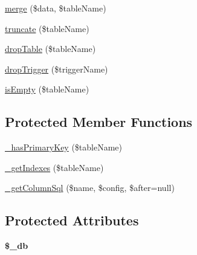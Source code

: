 \begin{DoxyCompactItemize}
\item 
\hyperlink{classDbSync__Table__DbAdapter__Mysql_a15ec3683b5473be0e2c7a24b9e78dfb5}{merge} (\$data, \$tableName)
\item 
\hyperlink{classDbSync__Table__DbAdapter__Mysql_a3bd21ebc1da5c9eb8b17c884201226d8}{truncate} (\$tableName)
\item 
\hyperlink{classDbSync__Table__DbAdapter__Mysql_ae489c716f124c842b3effd83433b0bda}{dropTable} (\$tableName)
\item 
\hyperlink{classDbSync__Table__DbAdapter__Mysql_a47230a67ff7e8c926ee6fb421764e5ec}{dropTrigger} (\$triggerName)
\item 
\hyperlink{classDbSync__Table__DbAdapter__Mysql_a492a22c32d988393ab5456eec80b6923}{isEmpty} (\$tableName)
\end{DoxyCompactItemize}
\subsection*{Protected Member Functions}
\begin{DoxyCompactItemize}
\item 
\hyperlink{classDbSync__Table__DbAdapter__Mysql_a56894feff172b0d77cad42b4aebf0ade}{\_\-hasPrimaryKey} (\$tableName)
\item 
\hyperlink{classDbSync__Table__DbAdapter__Mysql_acc41d16b369c99409607267268e0764e}{\_\-getIndexes} (\$tableName)
\item 
\hyperlink{classDbSync__Table__DbAdapter__Mysql_a1a7d3bca83371bcb16cd7a59f810bb58}{\_\-getColumnSql} (\$name, \$config, \$after=null)
\end{DoxyCompactItemize}
\subsection*{Protected Attributes}
\begin{DoxyCompactItemize}
\item 
\hypertarget{classDbSync__Table__DbAdapter__Mysql_ae64f6e1da0331b741a73251aa5bec165}{
{\bfseries \$\_\-db}}
\label{classDbSync__Table__DbAdapter__Mysql_ae64f6e1da0331b741a73251aa5bec165}

\end{DoxyCompactItemize}



